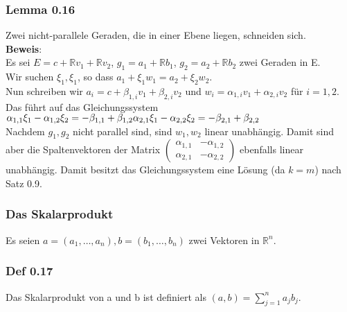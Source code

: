 \documentclass{scrartcl}
\newcommand{\R}{\mathbb{R}}
\newcommand{\mRn}{\(\mathbb{R}^n\)}
\newcommand{\al}{\alpha}
\begin{document}
\subsubsection{Lemma 0.16}
Zwei nicht-parallele Geraden, die in einer Ebene liegen, schneiden sich.\\
\textbf{Beweis}:\\
Es sei \(E = c + \R v_1 + \R v_2\), \(g_1 = a_1 + \R b_1\), \(g_2 = a_2 + \R b_2\) zwei Geraden in E.\\
Wir suchen \(\xi_1, \xi_1\), so dass \(a_1 + \xi_1 w_1 = a_2 + \xi_2 w_2\).\\
Nun schreiben wir \(a_i = c + \beta_{1,i} v_1 + \beta_{2,i} v_2\) und \(w_i = \al_{1,i} v_1 + \al_{2,i} v_2\) f\"ur \(i =1,2\).\\
Das f\"uhrt auf das Gleichungssystem\\
\(
\al_{1,1} \xi_1 - \al_{1,2} \xi_2 = - \beta_{1,1} + \beta_{1,2}\\
\al_{2,1} \xi_1 - \al_{2,2} \xi_2 = - \beta_{2,1} + \beta_{2,2}\\
\)\\
Nachdem \(g_1, g_2\) nicht parallel sind, sind \(w_1, w_2\) linear unabh\"angig. Damit sind aber die Spaltenvektoren der Matrix \(
\begin{pmatrix}
\al_{1,1} & -\al_{1,2}\\
\al_{2,1} & -\al_{2,2}
\end{pmatrix}
\) ebenfalls linear unabh\"angig. Damit besitzt das Gleichungssystem eine L\"osung (da \(k = m\)) nach Satz 0.9.

\subsubsection{Das Skalarprodukt}
Es seien \(a = (a_1, \dots, a_n), b = (b_1, \dots, b_n)\) zwei Vektoren in \mRn.\\

\subsubsection{Def 0.17}
Das Skalarprodukt von a und b ist definiert als \((a, b) = \sum_{j=1}^n a_j b_j\).
\end{document}
